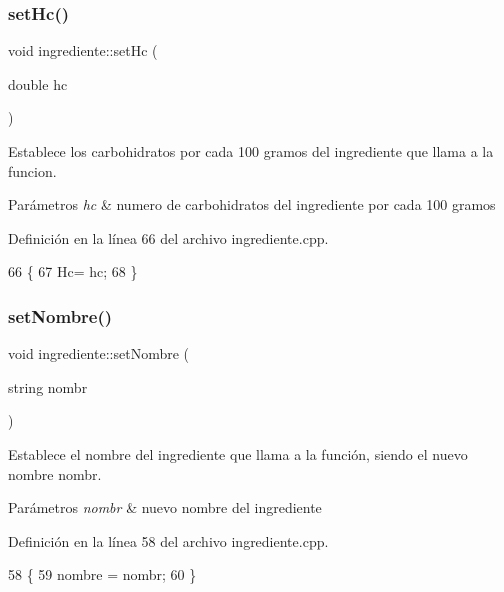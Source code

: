\subsubsection{\texorpdfstring{set\+Hc()}{setHc()}}
{\footnotesize\ttfamily void ingrediente\+::set\+Hc (\begin{DoxyParamCaption}\item[{double}]{hc }\end{DoxyParamCaption})}



Establece los carbohidratos por cada 100 gramos del ingrediente que llama a la funcion. 


\begin{DoxyParams}{Parámetros}
{\em hc} & numero de carbohidratos del ingrediente por cada 100 gramos \\
\hline
\end{DoxyParams}


Definición en la línea 66 del archivo ingrediente.\+cpp.


\begin{DoxyCode}
66                                 \{
67     Hc= hc;
68 \}
\end{DoxyCode}
\mbox{\label{classingrediente_a9603dba8fc6427d230996396bd6421c4}} 
\subsubsection{\texorpdfstring{set\+Nombre()}{setNombre()}}
{\footnotesize\ttfamily void ingrediente\+::set\+Nombre (\begin{DoxyParamCaption}\item[{string}]{nombr }\end{DoxyParamCaption})}



Establece el nombre del ingrediente que llama a la función, siendo el nuevo nombre nombr. 


\begin{DoxyParams}{Parámetros}
{\em nombr} & nuevo nombre del ingrediente \\
\hline
\end{DoxyParams}


Definición en la línea 58 del archivo ingrediente.\+cpp.


\begin{DoxyCode}
58                                        \{
59     nombre = nombr;
60 \}
\end{DoxyCode}
\mbox{\label{classingrediente_ab01241c7e378d26c09b1b453c68605c5}} 

